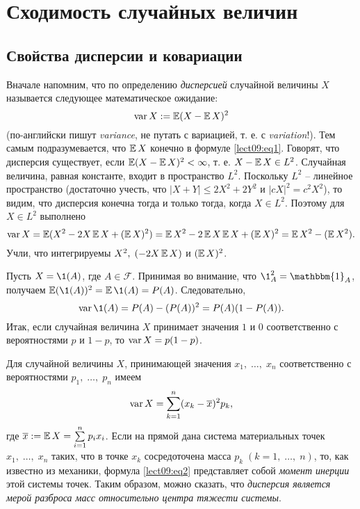 \section{Сходимость случайных величин}

\subsection{Свойства дисперсии и ковариации} 

Вначале напомним, что по определению \emph{дисперсией} случайной величины $X$ называется следующее математическое ожидание:
\begin{equation}\label{lect09:eq1}
\operatorname*{var} X:=\operatorname*{\mathbb{E}}(X-\operatorname*{\mathbb{E}} X)^2
\end{equation}
(по-английски пишут \emph{variance}, не путать с вариацией, т. е. с \emph{variation}!). Тем самым подразумевается, что $\operatorname*{\mathbb{E}} X$ конечно в формуле \ref{lect09:eq1}. Говорят, что дисперсия существует, если $\operatorname*{\mathbb{E}}(X-\operatorname*{\mathbb{E}} X)^2<\infty$, т. е. $X-\operatorname*{\mathbb{E}} X\in L^2$. Случайная величина, равная константе, входит в пространство $L^2$. Поскольку $L^2$ -- линейное пространство (достаточно учесть, что $|X+Y|\leqslant 2X^2+2Y^2$ и $|cX|^2=c^2X^2$), то видим, что дисперсия конечна тогда и только тогда, когда $X\in L^2$. Поэтому для $X\in L^2$ выполнено
\[ \operatorname*{var} X=\operatorname*{\mathbb{E}}(X^2-2X\operatorname*{\mathbb{E}} X+(\operatorname*{\mathbb{E}} X)^2)=\operatorname*{\mathbb{E}} X^2-2\operatorname*{\mathbb{E}} X\operatorname*{\mathbb{E}} X+(\operatorname*{\mathbb{E}} X)^2=\operatorname*{\mathbb{E}} X^2-(\operatorname*{\mathbb{E}} X^2). \]
Учли, что интегрируемы $X^2,\;(-2X\operatorname*{\mathbb{E}} X)$ и $(\operatorname*{\mathbb{E}} X)^2$.

\begin{example}\label{lect09:ex1}
Пусть $X=\1(A)$, где $A\in\mathcal{F}$. Принимая во внимание, что $\1_A^2=\mathbbm{1}_A$, получаем $\E(\1(A))^2=\E\1(A)=\P(A)$. Следовательно,
\[ \var\1(A)=\P(A)-(\P(A))^2=\P(A)(1-\P(A)). \]
Итак, если случайная величина $X$ принимает значения $1$ и $0$ соответственно с вероятностями $p$ и $1-p$, то $\operatorname*{var} X=p(1-p)$.
\end{example}

Для случайной величины $X$, принимающей значения $x_1,\;\ldots,\;x_n$ соответственно с вероятностями $p_1,\;\ldots,\;p_n$ имеем
\begin{equation}\label{lect09:eq2}
\operatorname*{var} X=\sum_{k=1}^n(x_k-\overline{x})^2p_k,
\end{equation}
где $\overline{x}:=\operatorname*{\mathbb{E}} X=\sum\limits_{i=1}^np_ix_i$. Если на прямой дана система материальных точек $x_1,\;\ldots,\;x_n$ таких, что в точке $x_k$ сосредоточена масса $p_k\;(k=1,\;\ldots,\;n)$, то, как известно из механики, формула \ref{lect09:eq2} представляет собой \emph{момент инерции} этой системы точек. Таким образом, можно сказать, что \emph{дисперсия является мерой разброса масс относительно центра тяжести системы}.

